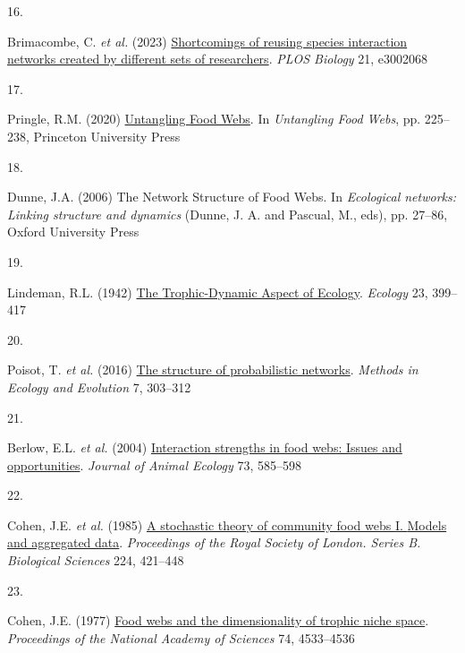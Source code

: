\documentclass[
]{article}
\newlength{\cslhangindent}
\newlength{\csllabelwidth}
\newenvironment{CSLReferences}[2] %
 {\begin{list}{}{%
  \setlength{\itemindent}{0pt}
  \setlength{\leftmargin}{0pt}
  \setlength{\parsep}{0pt}
  \ifodd #1
   \setlength{\leftmargin}{\cslhangindent}
   \setlength{\itemindent}{-1\cslhangindent}
  \fi
  \setlength{\itemsep}{#2\baselineskip}}}
 {\end{list}}
\newcommand{\CSLLeftMargin}[1]{\parbox[t]{\csllabelwidth}{\strut#1\strut}}
\newcommand{\CSLRightInline}[1]{\parbox[t]{\linewidth - \csllabelwidth}{\strut#1\strut}}
\begin{document}
\begin{CSLReferences}{0}{0}
\CSLLeftMargin{16. }%
\CSLRightInline{Brimacombe, C. \emph{et al.} (2023)
\href{https://doi.org/10.1371/journal.pbio.3002068}{Shortcomings of
reusing species interaction networks created by different sets of
researchers}. \emph{PLOS Biology} 21, e3002068}

\CSLLeftMargin{17. }%
\CSLRightInline{Pringle, R.M. (2020)
\href{https://doi.org/10.1515/9780691195322-020}{Untangling {Food
Webs}}. In \emph{Untangling {Food Webs}}, pp. 225--238, Princeton
University Press}

\CSLLeftMargin{18. }%
\CSLRightInline{Dunne, J.A. (2006) The {Network Structure} of {Food
Webs}. In \emph{Ecological networks: {Linking} structure and dynamics}
(Dunne, J. A. and Pascual, M., eds), pp. 27--86, Oxford University
Press}

\CSLLeftMargin{19. }%
\CSLRightInline{Lindeman, R.L. (1942)
\href{https://doi.org/10.2307/1930126}{The {Trophic-Dynamic Aspect} of
{Ecology}}. \emph{Ecology} 23, 399--417}

\CSLLeftMargin{20. }%
\CSLRightInline{Poisot, T. \emph{et al.} (2016)
\href{https://doi.org/10}{The structure of probabilistic networks}.
\emph{Methods in Ecology and Evolution} 7, 303--312}

\CSLLeftMargin{21. }%
\CSLRightInline{Berlow, E.L. \emph{et al.} (2004)
\href{https://doi.org/10.1111/j.0021-8790.2004.00833.x}{Interaction
strengths in food webs: Issues and opportunities}. \emph{Journal of
Animal Ecology} 73, 585--598}

\CSLLeftMargin{22. }%
\CSLRightInline{Cohen, J.E. \emph{et al.} (1985)
\href{https://doi.org/10.1098/rspb.1985.0042}{A stochastic theory of
community food webs {I}. {Models} and aggregated data}.
\emph{Proceedings of the Royal Society of London. Series B. Biological
Sciences} 224, 421--448}

\CSLLeftMargin{23. }%
\CSLRightInline{Cohen, J.E. (1977)
\href{https://doi.org/10.1073/pnas.74.10.4533}{Food webs and the
dimensionality of trophic niche space}. \emph{Proceedings of the
National Academy of Sciences} 74, 4533--4536}


\end{CSLReferences}
\end{document}
